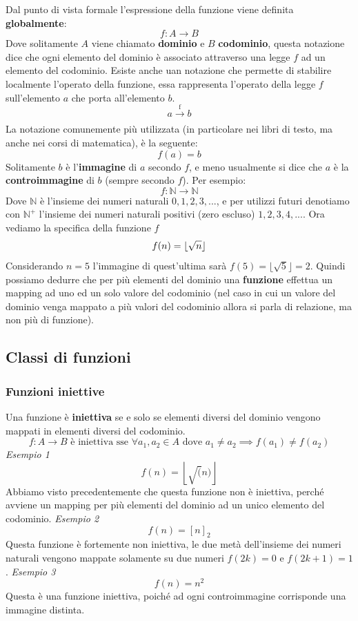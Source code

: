 \documentclass{article}
\begin{document}
Dal punto di vista formale l'espressione della funzione viene definita \textbf{globalmente}:
$$f:A\rightarrow B$$
Dove solitamente $A$ viene chiamato \textbf{dominio} e $B$ \textbf{codominio}, questa notazione dice che ogni elemento del dominio è associato attraverso una legge $f$ ad un elemento del codominio. Esiste anche uan notazione che permette di stabilire localmente l'operato della funzione, essa rappresenta l'operato della legge $f$ sull'elemento $a$ che porta all'elemento $b$.
$$a \xrightarrow[\text{}]{\text{f}} b$$
\newline
La notazione comunemente più utilizzata (in particolare nei libri di testo, ma anche nei corsi di matematica), è la seguente:
$$f(a)=b$$
Solitamente $b$ è l'\textbf{immagine} di $a$ secondo $f$, e meno usualmente si dice che $a$ è la \textbf{controimmagine} di $b$ (sempre secondo $f$).
\newline
\newline
Per esempio:
$$f:\mathbb{N} \rightarrow \mathbb{N}$$
Dove $\mathbb{N}$ è l'insieme dei numeri naturali ${0,1,2,3,...}$, e per utilizzi futuri denotiamo con $\mathbb{N}^+$ l'insieme dei numeri naturali positivi (zero escluso) ${1,2,3,4,...}$.
\newline
Ora vediamo la specifica della funzione $f$
$$f(n)=\lfloor \sqrtsign{n}\rfloor$$
Considerando $n=5$ l'immagine di quest'ultima sarà $f(5)=\lfloor\sqrt{5}\rfloor=2$.
\newline
Quindi possiamo dedurre che per più elementi del dominio una \textbf{funzione} effettua un mapping ad uno ed un solo valore del codominio (nel caso in cui un valore del dominio venga mappato a più valori del codominio allora si parla di relazione, ma non più di funzione).
\subsection{Classi di funzioni}
\subsubsection{Funzioni iniettive}

Una funzione è \textbf{iniettiva} se e solo se elementi diversi del dominio vengono mappati in elementi diversi del codominio.
$$f:A\rightarrow B\text{ è iniettiva sse } \forall a_1,a_2\in A \text{ dove } a_1\neq a_2 \implies f(a_1)\neq f(a_2)$$
\newline
\textit{Esempio 1}
$$f(n)=\left\lfloor\sqrt(n)\right\rfloor$$
Abbiamo visto precedentemente che questa funzione non è iniettiva, perché avviene un mapping per più elementi del dominio ad un unico elemento del codominio.
\newline
\newline
\textit{Esempio 2}
$$f(n)=[n]_2$$
Questa funzione è fortemente non iniettiva, le due metà dell'insieme dei numeri naturali vengono mappate solamente su due numeri $f(2k)=0$ e $f(2k+1)=1$.
\newline
\newline
\textit{Esempio 3}
$$f(n)=n^2$$
Questa è una funzione iniettiva, poiché ad ogni controimmagine corrisponde una immagine distinta.
\end{document}
